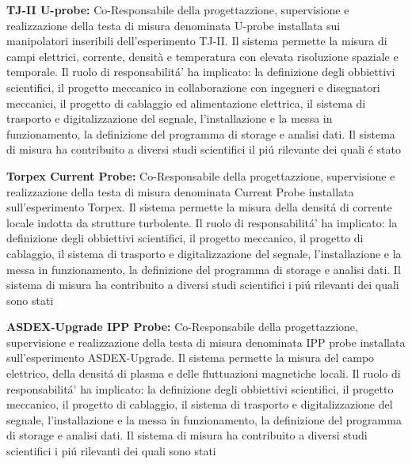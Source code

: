 \begin{enumerate}[label={[Q\arabic*]}]
\item \textbf{TJ-II U-probe:}  Co-Responsabile della progettazzione, 
  supervisione e realizzazione della testa di misura
  denominata U-probe installata sui manipolatori inseribili
  dell'esperimento TJ-II. Il sistema permette la misura di campi elettrici, corrente,
  densità e temperatura con elevata risoluzione spaziale e temporale.  Il
  ruolo di responsabilit{\'a'} ha implicato: la definizione degli
  obbiettivi scientifici, il progetto meccanico in collaborazione con
  ingegneri e disegnatori meccanici, il progetto di cablaggio ed
  alimentazione elettrica, il sistema di trasporto e digitalizzazione
  del segnale, l'installazione e la messa in funzionamento,  la
  definizione del programma di storage e analisi dati. Il sistema di
  misura ha contribuito a diversi studi scientifici il pi{\'u}
  rilevante dei quali {\'e} stato \cite{Spolaore:2015ij}

\item \textbf{Torpex Current Probe:}  Co-Responsabile della progettazzione, 
  supervisione e realizzazione della testa di misura
  denominata Current Probe installata sull'esperimento Torpex.
  Il sistema permette la misura della densit{\'a} di corrente locale
  indotta da strutture turbolente.  Il
  ruolo di responsabilit{\'a'} ha implicato: la definizione degli
  obbiettivi scientifici, il progetto meccanico, il progetto di
  cablaggio,
  il sistema di trasporto e digitalizzazione
  del segnale, l'installazione e la messa in funzionamento,  la
  definizione del programma di storage e analisi dati.   Il sistema di
  misura ha contribuito a diversi studi scientifici i pi{\'u}
  rilevanti dei quali sono stati \cite{Furno:2011cs,
    Fasoli:2013gj,0741-3335-53-12-124016}

  \item \textbf{ASDEX-Upgrade IPP Probe:}  Co-Responsabile della progettazzione, 
  supervisione e realizzazione della testa di misura
  denominata IPP probe installata sull'esperimento ASDEX-Upgrade.
  Il sistema permette la misura del campo elettrico,  della
  densit{\'a} di plasma e delle fluttuazioni magnetiche locali.  Il
  ruolo di responsabilit{\'a'} ha implicato: la definizione degli
  obbiettivi scientifici, il progetto meccanico, il progetto di
  cablaggio,
  il sistema di trasporto e digitalizzazione
  del segnale, l'installazione e la messa in funzionamento,  la
  definizione del programma di storage e analisi dati.   Il sistema di
  misura ha contribuito a diversi studi scientifici i pi{\'u}
  rilevanti dei quali sono stati \cite{PhysRevLett.106.125002,
    Naulin:2011im, Muller:2011kj}


\end{enumerate}
